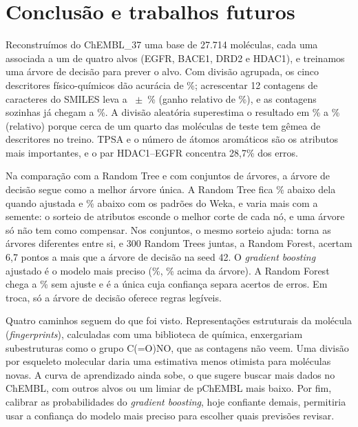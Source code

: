 \section{Conclusão e trabalhos futuros}

Reconstruímos do ChEMBL\_37 uma base de 27.714 moléculas, cada uma associada a um de quatro alvos (EGFR, BACE1, DRD2 e HDAC1), e treinamos uma árvore de decisão para prever o alvo. Com divisão agrupada, os cinco descritores físico-químicos dão acurácia de \accGrupDesc\%; acrescentar 12 contagens de caracteres do SMILES leva a \accGrupAmbos~$\pm$~\sdGrupAmbos\% (ganho relativo de \ganhoAmbos\%), e as contagens sozinhas já chegam a \accGrupSmiles\%. A divisão aleatória superestima o resultado em \gapMin\% a \gapMax\% (relativo) porque cerca de um quarto das moléculas de teste tem gêmea de descritores no treino. TPSA e o número de átomos aromáticos são os atributos mais importantes, e o par HDAC1--EGFR concentra 28,7\% dos erros.

Na comparação com a Random Tree e com conjuntos de árvores, a árvore de decisão segue como a melhor árvore única. A Random Tree fica \relRT\% abaixo dela quando ajustada e \relRTweka\% abaixo com os padrões do Weka, e varia mais com a semente: o sorteio de atributos esconde o melhor corte de cada nó, e uma árvore só não tem como compensar. Nos conjuntos, o mesmo sorteio ajuda: torna as árvores diferentes entre si, e 300 Random Trees juntas, a Random Forest, acertam 6,7 pontos a mais que a árvore de decisão na seed 42. O \emph{gradient boosting} ajustado é o modelo mais preciso (\accGBaj\%, \relGBaj\% acima da árvore). A Random Forest chega a \accRF\% sem ajuste e é a única cuja confiança separa acertos de erros. Em troca, só a árvore de decisão oferece regras legíveis.

Quatro caminhos seguem do que foi visto. Representações estruturais da molécula (\emph{fingerprints}), calculadas com uma biblioteca de química, enxergariam subestruturas como o grupo C(=O)NO, que as contagens não veem. Uma divisão por esqueleto molecular daria uma estimativa menos otimista para moléculas novas. A curva de aprendizado ainda sobe, o que sugere buscar mais dados no ChEMBL, com outros alvos ou um limiar de pChEMBL mais baixo. Por fim, calibrar as probabilidades do \emph{gradient boosting}, hoje confiante demais, permitiria usar a confiança do modelo mais preciso para escolher quais previsões revisar.

